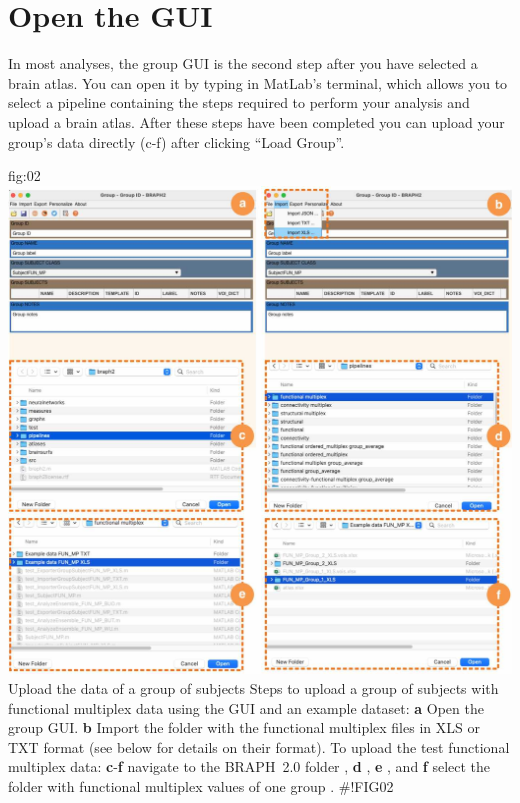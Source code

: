 \documentclass[justified]{tufte-handout}
\begin{document}
\section{Open the GUI}

In most analyses, the group GUI is the second step after you have selected a brain atlas. You can open it by typing  in MatLab's terminal, which allows you to select a pipeline containing the steps required to perform your analysis and upload a brain atlas. After these steps have been completed you can upload your group's data directly (c-f) after clicking ``Load Group''. 

	{fig:02}
	{
	\includegraphics{fig02.jpg}
	}
	{Upload the data of a group of subjects}
	{
	Steps to upload a group of subjects with functional multiplex data using the GUI and an example dataset: 
	{\bf a} Open the group GUI.
	{\bf b} Import the folder with the functional multiplex files in XLS or TXT format (see below for details on their format).
	To upload the test functional multiplex data:
	{\bf c}-{\bf f} navigate to the BRAPH~2.0 folder , {\bf d} ,  {\bf e} , and {\bf f} select the folder with functional multiplex values of one group .
	}
#!FIG02
\end{document}

